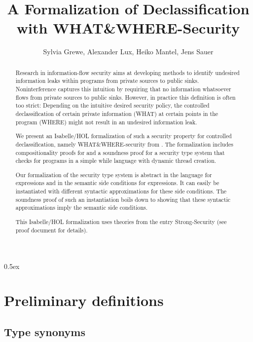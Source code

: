 \documentclass[11pt,a4paper]{article}
\begin{document}
\title{A Formalization of Declassification with WHAT\&WHERE-Security}
\author{Sylvia Grewe, Alexander Lux, Heiko Mantel, Jens Sauer}
\maketitle

\begin{abstract}
  Research in information-flow security aims at developing methods to
  identify undesired information leaks within programs from private
  sources to public sinks. Noninterference captures this intuition by
  requiring that no information whatsoever flows from private sources
  to public sinks. However, in practice this definition is often too
  strict: Depending on the intuitive desired security policy, the
  controlled declassification of certain private information (WHAT) at
  certain points in the program (WHERE) might not result in an
  undesired information leak.

  We present an Isabelle/HOL formalization of such a security property
  for controlled declassification, namely WHAT\&WHERE-security from
  \cite{scheduler-independent}. The formalization includes
  compositionality proofs for and a soundness proof for a security
  type system that checks for programs in a simple while language with
  dynamic thread creation.

  Our formalization of the security type system is abstract in the
  language for expressions and in the semantic side conditions for
  expressions. It can easily be instantiated with different syntactic
  approximations for these side conditions. The soundness proof of
  such an instantiation boils down to showing that these syntactic
  approximations imply the semantic side conditions.

  This Isabelle/HOL formalization uses theories from the entry
  Strong-Security (see proof document for details).
\end{abstract}

\tableofcontents

\parindent 0pt\parskip 0.5ex

%

\section{Preliminary definitions}

\subsection{Type synonyms}
\end{document}
